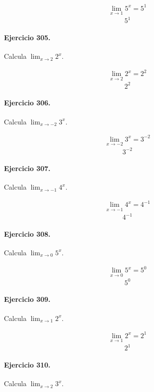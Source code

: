 \documentclass[11pt,a4paper]{article}
\begin{document}
\[
\begin{aligned}
\lim_{x\to 1}5^x=5^{1}
\end{aligned}
\]
\[\boxed{5^{1}}\]


\paragraph{Ejercicio 305.} Calcula $\displaystyle\lim_{x\to 2}2^x$.

\[
\begin{aligned}
\lim_{x\to 2}2^x=2^{2}
\end{aligned}
\]
\[\boxed{2^{2}}\]


\paragraph{Ejercicio 306.} Calcula $\displaystyle\lim_{x\to -2}3^x$.

\[
\begin{aligned}
\lim_{x\to -2}3^x=3^{-2}
\end{aligned}
\]
\[\boxed{3^{-2}}\]


\paragraph{Ejercicio 307.} Calcula $\displaystyle\lim_{x\to -1}4^x$.

\[
\begin{aligned}
\lim_{x\to -1}4^x=4^{-1}
\end{aligned}
\]
\[\boxed{4^{-1}}\]


\paragraph{Ejercicio 308.} Calcula $\displaystyle\lim_{x\to 0}5^x$.

\[
\begin{aligned}
\lim_{x\to 0}5^x=5^{0}
\end{aligned}
\]
\[\boxed{5^{0}}\]


\paragraph{Ejercicio 309.} Calcula $\displaystyle\lim_{x\to 1}2^x$.

\[
\begin{aligned}
\lim_{x\to 1}2^x=2^{1}
\end{aligned}
\]
\[\boxed{2^{1}}\]


\paragraph{Ejercicio 310.} Calcula $\displaystyle\lim_{x\to 2}3^x$.
\end{document}
